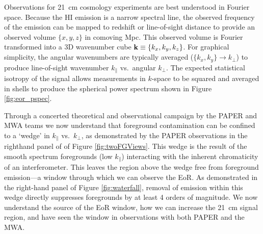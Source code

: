 \documentclass[preprint]{aastex}
\def\kperp{k_{\bot}}
\def\kpar{k_{\|}}
\def\kperp{k_{\bot}}
\def\kpar{k_{\|}}
\def\k{{\bf k}}
\def\HI{{H{\small I }}}
\begin{document}
Observations for 21~cm cosmology experiments are best understood in
Fourier space.  Because the \HI emission is a
narrow spectral line, the observed frequency of the emission can be mapped to
redshift or line-of-sight distance to provide an observed volume $\{x,y,z\}$ in
comoving Mpc. This observed volume is Fourier transformed into a 3D
wavenumber cube $\k\equiv\{k_{x}, k_{y}, k_{z}\}$. For graphical simplicity, the angular
wavenumbers are typically averaged ($\{k_{x},k_{y}\}\rightarrow\kperp$) to
produce line-of-sight wavenumber $\kpar$ vs.\ angular $\kperp$. 
The expected statistical isotropy of the signal allows measurements in $k$-space to be
squared and averaged in shells to produce the spherical power spectrum
shown in Figure \ref{fig:eor_pspec}.

Through a concerted theoretical and observational campaign by the PAPER and MWA teams
\citep{morales_et_al2012,parsons_et_al2012b,vedantham_2012,Datta_2010,hazelton_et_al2013,pober_et_al2013,parsons_et_al2013,dillon_et_al2013b}
we now understand that foreground contamination can be confined to a `wedge' in
$\kpar$ vs.\ $\kperp$, as demonstrated by the PAPER observations in the
righthand panel of of Figure \ref{fig:twoFGViews}. 
This wedge is the result of
the smooth spectrum foregrounds 
(low $\kpar$) interacting with the inherent
chromaticity of an interferometer. 
This leaves the region above the wedge free from 
foreground emission---a window through which we can observe the EoR. 
As demonstrated in the right-hand panel of Figure \ref{fig:waterfall}, removal of emission within
this wedge directly suppresses foregrounds by at least 4 orders of magnitude.
We now understand the source of the EoR window, how we can increase the 21~cm signal region, and have seen the window in observations with both PAPER and the MWA.
\end{document}
